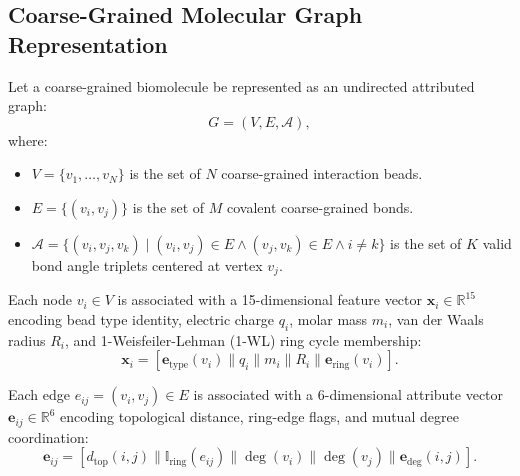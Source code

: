 \documentclass[11pt,a4paper]{article}
\begin{document}
\subsection{Coarse-Grained Molecular Graph Representation}
Let a coarse-grained biomolecule be represented as an undirected attributed graph:
\begin{equation}
G = (V, E, \mathcal{A}),
\end{equation}
where:
\begin{itemize}
    \item $V = \{v_1, \dots, v_N\}$ is the set of $N$ coarse-grained interaction beads.
    \item $E = \{(v_i, v_j)\}$ is the set of $M$ covalent coarse-grained bonds.
    \item $\mathcal{A} = \{(v_i, v_j, v_k) \mid (v_i, v_j) \in E \land (v_j, v_k) \in E \land i \ne k\}$ is the set of $K$ valid bond angle triplets centered at vertex $v_j$.
\end{itemize}

Each node $v_i \in V$ is associated with a 15-dimensional feature vector $\mathbf{x}_i \in \mathbb{R}^{15}$ encoding bead type identity, electric charge $q_i$, molar mass $m_i$, van der Waals radius $R_i$, and 1-Weisfeiler-Lehman (1-WL) ring cycle membership:
\begin{equation}
\mathbf{x}_i = [\mathbf{e}_{\text{type}}(v_i) \parallel q_i \parallel m_i \parallel R_i \parallel \mathbf{e}_{\text{ring}}(v_i)].
\end{equation}

Each edge $e_{ij} = (v_i, v_j) \in E$ is associated with a 6-dimensional attribute vector $\mathbf{e}_{ij} \in \mathbb{R}^6$ encoding topological distance, ring-edge flags, and mutual degree coordination:
\begin{equation}
\mathbf{e}_{ij} = [d_{\text{top}}(i, j) \parallel \mathbb{I}_{\text{ring}}(e_{ij}) \parallel \deg(v_i) \parallel \deg(v_j) \parallel \mathbf{e}_{\text{deg}}(i, j)].
\end{equation}
\end{document}
